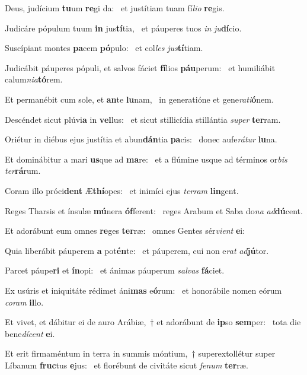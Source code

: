 \item Deus, judícium \textbf{tu}um \textbf{re}gi da:~\psstar{} et justítiam tuam fí\textit{lio} \textbf{re}gis.
\item Judicáre pópulum tuum \textbf{in} jus\textbf{tí}tia,~\psstar{} et páuperes tuos \textit{in} \textit{ju}\textbf{dí}cio.
\item Suscípiant montes \textbf{pa}cem \textbf{pó}pulo:~\psstar{} et col\textit{les} \textit{jus}\textbf{tí}tiam.
\item Judicábit páuperes pópuli, et salvos fáciet \textbf{fí}lios \textbf{páu}perum:~\psstar{} et humiliábit calum\textit{nia}\textbf{tó}rem.
\item Et permanébit cum sole, et \textbf{an}te \textbf{lu}nam,~\psstar{} in generatióne et gene\textit{rati}\textbf{ó}nem.
\item Descéndet sicut plúvi\textbf{a} in \textbf{vel}lus:~\psstar{} et sicut stillicídia stillántia \textit{super} \textbf{ter}ram.
\item Oriétur in diébus ejus justítia et abun\textbf{dán}tia \textbf{pa}cis:~\psstar{} donec aufe\textit{rátur} \textbf{lu}na.
\item Et dominábitur a mari \textbf{us}que ad \textbf{ma}re:~\psstar{} et a flúmine usque ad términos or\textit{bis} \textit{ter}\textbf{rá}rum.
\item Coram illo próci\textbf{dent} Æ\textbf{thí}opes:~\psstar{} et inimíci ejus \textit{terram} \textbf{lin}gent.
\item Reges Tharsis et ínsulæ \textbf{mú}nera \textbf{óf}ferent:~\psstar{} reges Arabum et Saba do\textit{na} \textit{ad}\textbf{dú}cent.
\item Et adorábunt eum omnes \textbf{re}ges \textbf{ter}ræ:~\psstar{} omnes Gentes sér\textit{vient} \textbf{e}i:
\item Quia liberábit páuperem \textbf{a} pot\textbf{én}te:~\psstar{} et páuperem, cui non e\textit{rat} \textit{ad}\textbf{jú}tor.
\item Parcet páupe\textbf{ri} et \textbf{ín}opi:~\psstar{} et ánimas páuperum \textit{salvas} \textbf{fá}ciet.
\item Ex usúris et iniquitáte rédimet áni\textbf{mas} e\textbf{ó}rum:~\psstar{} et honorábile nomen eórum \textit{coram} \textbf{il}lo.
\item Et vivet, et dábitur ei de auro Arábiæ,~† et adorábunt de \textbf{ip}so \textbf{sem}per:~\psstar{} tota die bene\textit{dícent} \textbf{e}i.
\item Et erit firmaméntum in terra in summis móntium,~† superextollétur super Líbanum \textbf{fruc}tus \textbf{e}jus:~\psstar{} et florébunt de civitáte sicut \textit{fenum} \textbf{ter}ræ.
